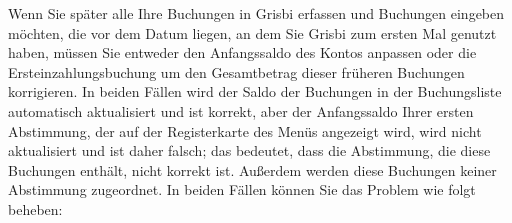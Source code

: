 Wenn Sie später alle Ihre Buchungen in Grisbi erfassen und Buchungen eingeben möchten, die vor dem Datum liegen, an dem Sie Grisbi zum ersten Mal genutzt haben, müssen Sie entweder den Anfangssaldo des Kontos anpassen oder die Ersteinzahlungsbuchung um den Gesamtbetrag dieser früheren Buchungen korrigieren. In beiden Fällen wird der Saldo der Buchungen in der Buchungsliste automatisch aktualisiert und ist korrekt, aber der Anfangssaldo Ihrer ersten Abstimmung, der auf der Registerkarte  des Menüs  angezeigt wird, wird nicht aktualisiert und ist daher falsch; das bedeutet, dass die Abstimmung, die diese Buchungen enthält, nicht korrekt ist. Außerdem werden diese Buchungen keiner Abstimmung zugeordnet. In beiden Fällen können Sie das Problem wie folgt beheben:

